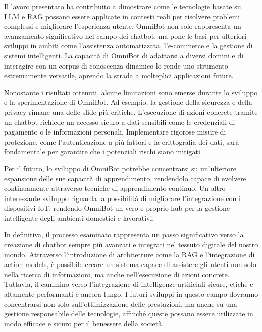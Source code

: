 Il lavoro presentato ha contribuito a dimostrare come le tecnologie basate su LLM e RAG possano essere applicate in contesti reali per risolvere problemi complessi e migliorare l'esperienza utente. OmniBot non solo rappresenta un avanzamento significativo nel campo dei chatbot, ma pone le basi per ulteriori sviluppi in ambiti come l'assistenza automatizzata, l'e-commerce e la gestione di sistemi intelligenti. La capacità di OmniBot di adattarsi a diversi domini e di interagire con un corpus di conoscenza dinamico lo rende uno strumento estremamente versatile, aprendo la strada a molteplici applicazioni future.

Nonostante i risultati ottenuti, alcune limitazioni sono emerse durante lo sviluppo e la sperimentazione di OmniBot. Ad esempio, la gestione della sicurezza e della privacy rimane una delle sfide più critiche. L'esecuzione di azioni concrete tramite un chatbot richiede un accesso sicuro a dati sensibili come le credenziali di pagamento o le informazioni personali. Implementare rigorose misure di protezione, come l'autenticazione a più fattori e la crittografia dei dati, sarà fondamentale per garantire che i potenziali rischi siano mitigati.

Per il futuro, lo sviluppo di OmniBot potrebbe concentrarsi su un'ulteriore espansione delle sue capacità di apprendimento, rendendolo capace di evolvere continuamente attraverso tecniche di apprendimento continuo. Un altro interessante sviluppo riguarda la possibilità di migliorare l'integrazione con i dispositivi IoT, rendendo OmniBot un vero e proprio hub per la gestione intelligente degli ambienti domestici e lavorativi.

In definitiva, il processo esaminato rappresenta un passo significativo verso la creazione di chatbot sempre più avanzati e integrati nel tessuto digitale del nostro mondo. Attraverso l'introduzione di architetture come la RAG e l'integrazione di action models, è possibile creare un sistema capace di assistere gli utenti non solo nella ricerca di informazioni, ma anche nell'esecuzione di azioni concrete. Tuttavia, il cammino verso l'integrazione di intelligenze artificiali sicure, etiche e altamente performanti è ancora lungo. I futuri sviluppi in questo campo dovranno concentrarsi non solo sull'ottimizzazione delle prestazioni, ma anche su una gestione responsabile delle tecnologie, affinché queste possano essere utilizzate in modo efficace e sicuro per il benessere della società.
